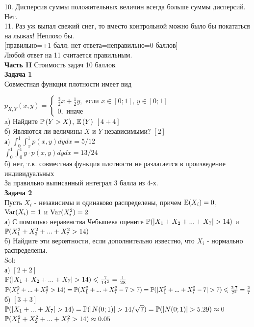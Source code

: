 \documentclass[12pt, a4paper]{article}\usepackage[]{graphicx}\usepackage[]{color}
\begin{document}
	10. Дисперсия суммы положительных величин всегда больше суммы дисперсий. Нет. \\

	11. Раз уж выпал свежий снег, то вместо контрольной можно
	было бы покататься на лыжах! Неплохо бы. \\


	$[$правильно=+1 балл; нет ответа=неправильно=0 баллов$]$ \\
	Любой ответ на 11 считается правильным. \\


	\textbf{Часть II} Стоимость задач 10 баллов. \\

	\textbf{Задача 1} \\ %
	Совместная функция плотности имеет вид

	$p_{X,Y} \left(x,y\right)=
	\left\{
	\begin{array}{l}
	{\frac{3}{2}x+\frac{1}{2}y, \text{ если } x\in \left[0;1\right],\, y\in \left[0;1\right]} \\
	{0,\text{ иначе} }
	\end{array}\right. $\\
	a) Найдите  $\P\left(Y>X\right)$,  $\E\left(Y\right)$ $[4+4]$ \\
	б) Являются ли величины $X$ и $Y$ независимыми? $[2]$ \\

	а) $\int_{0}^{1}\int_{x}^{1}p(x,y)dydx=5/12$ \\
	$\int_{0}^{1}\int_{0}^{1}y\cdot p(x,y)dydx=13/24$ \\
	б) нет, т.к. совместная функция плотности не разлагается в произведение индивидуальных \\
	За правильно выписанный интеграл 3 балла из 4-х. \\



	\textbf{Задача 2} \\ %
	Пусть $X_{i}$ - независимы и одинаково распределены, причем $\E(X_{i})=0$, $\Var(X_{i})=1$ и $\Var(X_{i}^{2})=2$ \\
	а) С помощью неравенства Чебышева оцените $\P(|X_{1}+X_{2}+...+X_{7}|>14)$ и $\P(X_{1}^{2}+X_{2}^{2}+...+X_{7}^{2}>14)$ \\
	б) Найдите эти вероятности, если дополнительно известно, что $X_{i}$ - нормально распределены. \\
	Sol: \\
	а) $[2+2]$ \\
	$\P(|X_{1}+X_{2}+...+X_{7}|>14)\leq \frac{7}{14^2}=\frac{1}{28}$ \\
	$\P(X_{1}^{2}+...+X_{7}^{2}>14)=\P(X_{1}^{2}+...+X_{7}^{2}-7>7)=\P(|X_{1}^{2}+...+X_{7}^{2}-7|>7)\leq \frac{2\cdot 7}{7^2}=\frac{2}{7}$ \\
	б) $[3+3]$ \\
	$\P(|X_{1}+...+X_{7}|>14)=\P(|N(0;1)|>14/\sqrt{7})=\P(|N(0;1)|>5.29)\approx 0$ \\
	$\P(X_{1}^{2}+X_{2}^{2}+...+X_{7}^{2}>14)\approx 0.05$ \\
\end{document}
